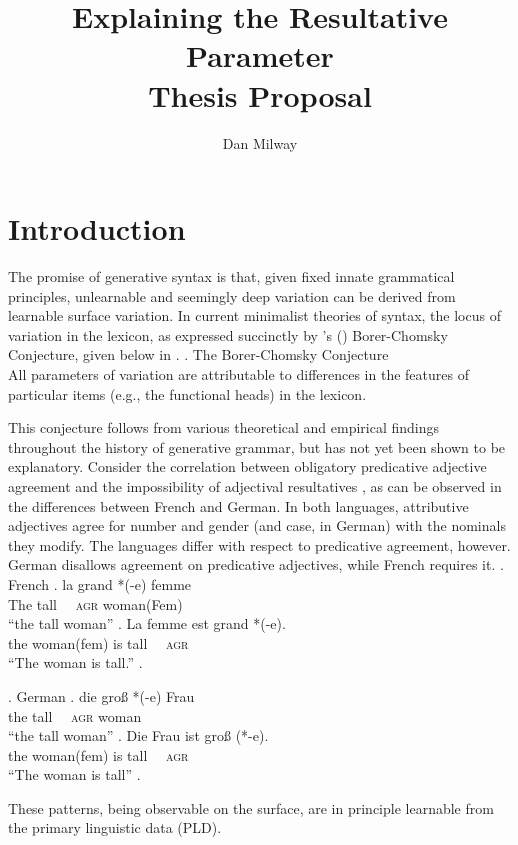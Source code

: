 \documentclass[letterpaper,12pt]{article}
\title{Explaining the Resultative Parameter\\{\large Thesis Proposal}}
\author{Dan Milway}
\begin{document}
\maketitle

\section{Introduction}
The promise of generative syntax is that, given fixed innate grammatical principles, unlearnable and seemingly deep variation can be derived from learnable surface variation.
In current minimalist theories of syntax, the locus of variation in the lexicon, as expressed succinctly by \citeauthor{baker2008microparameter}'s (\citeyear{baker2008microparameter}) Borer-Chomsky Conjecture, given below in \Next.
\ex. The Borer-Chomsky Conjecture\\
All parameters of variation are attributable to differences in the features of particular items (e.g., the functional heads) in the lexicon. \hfill \parencite{baker2008microparameter}

This conjecture follows from various theoretical and empirical findings throughout the history of generative grammar, but has not yet been shown to be explanatory.
Consider the correlation between obligatory predicative adjective agreement and the impossibility of adjectival resultatives \parencite{kratzer_building_2004}, as can be observed in the differences between French and German.
In both languages, attributive adjectives agree for number and gender (and case, in German) with the nominals they modify. 
The languages differ with respect to predicative agreement, however.
German disallows agreement on predicative adjectives, while French requires it.
\ex. French 
\ag. la grand *(-e) femme\\
The tall \textsc{~~agr} woman(Fem)\\
``the tall woman''
\bg. La femme est grand *(-e).\\
the woman(fem) is tall \textsc{~~agr}\\
``The woman is tall.''
\z.

\ex. German 
\ag. die gro\ss{} *(-e) Frau\\
the tall \textsc{~~agr} woman\\
``the tall woman''
\bg. Die Frau ist gro\ss{} (*-e).\\
the woman(fem) is tall \textsc{~~agr}\\
``The woman is tall''
\z.

These patterns, being observable on the surface, are in principle learnable from the primary linguistic data (PLD).
\end{document}
